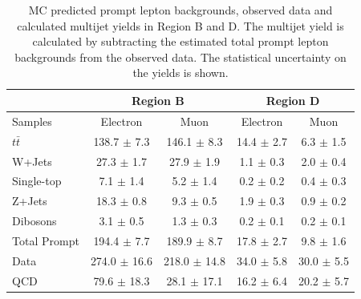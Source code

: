 \begin{table}
\begin{center}
\begin{tabular}{l|c|c||c|c}
             &\multicolumn{2}{c||}{Region B}                &\multicolumn{2}{c}{Region D} \\
\hline
Samples       & Electron               & Muon                & Electron          & Muon \\      
\hline
$t\bar{t}$    &  138.7 $\pm$ 7.3      & 146.1 $\pm$ 8.3      & 14.4 $\pm$ 2.7    & 6.3  $\pm$ 1.5  \\
W+Jets        &  27.3 $\pm$ 1.7       & 27.9 $\pm$ 1.9       & 1.1 $\pm$ 0.3    & 2.0  $\pm$ 0.4  \\        
Single-top    &  7.1  $\pm$ 1.4       & 5.2  $\pm$ 1.4     &  0.2 $\pm$ 0.2    &  0.4  $\pm$ 0.3  \\
Z+Jets        &  18.3  $\pm$ 0.8       & 9.3  $\pm$ 0.5     &  1.9 $\pm$ 0.3    &  0.9  $\pm$ 0.2  \\
Dibosons      &  3.1  $\pm$ 0.5       & 1.3  $\pm$ 0.3     &  0.2 $\pm$ 0.1    &  0.2  $\pm$ 0.1  \\
\hline
Total Prompt  &  194.4 $\pm$ 7.7      & 189.9 $\pm$ 8.7    & 17.8 $\pm$ 2.7    & 9.8  $\pm$ 1.6  \\
\hline
Data          &  274.0  $\pm$ 16.6      & 218.0   $\pm$ 14.8    & 34.0  $\pm$ 5.8   & 30.0   $\pm$ 5.5  \\
\hline
QCD           & 79.6 $\pm$ 18.3       & 28.1 $\pm$ 17.1    & 16.2 $\pm$ 6.4  & 20.2 $\pm$ 5.7 \\
\end{tabular}
\end{center}
\caption{MC predicted prompt lepton backgrounds, observed data and calculated multijet yields
in Region B and D. The multijet yield is calculated by subtracting the estimated total prompt lepton
backgrounds from the observed data. The statistical uncertainty on the yields is shown.}
\label{tab:boosted_region_bd_promptbkgd_data_new}
\end{table}


